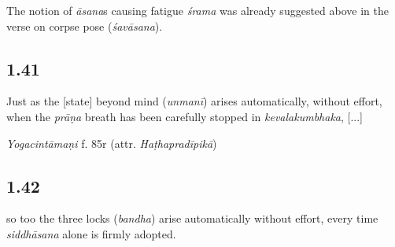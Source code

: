 \begin{ekdosis}
\begin{philcomm}[hp01_040]


The notion of \emph{āsana}s causing fatigue \emph{śrama} was already suggested above in the verse on corpse pose (\emph{śavāsana}).
\end{philcomm}


\subsection*{1.41}
\begin{translation}[hp01_041]
Just as the [state] beyond mind (\emph{unmanī}) arises automatically, without effort, when the \emph{prāṇa} breath has been carefully stopped in \emph{kevalakumbhaka}, [...]
\end{translation}


\begin{testimonia}[hp01_041]
\emph{Yogacintāmaṇi} f. 85r (attr. \emph{Haṭhapradīpikā})

\begin{versinnote}
\end{versinnote}

\end{testimonia}


\subsection*{1.42}
\begin{translation}[hp01_042]
[...] so too the three locks (\emph{bandha}) arise automatically without effort, every time \emph{siddhāsana} alone is firmly adopted.
\end{translation}



\end{ekdosis}
